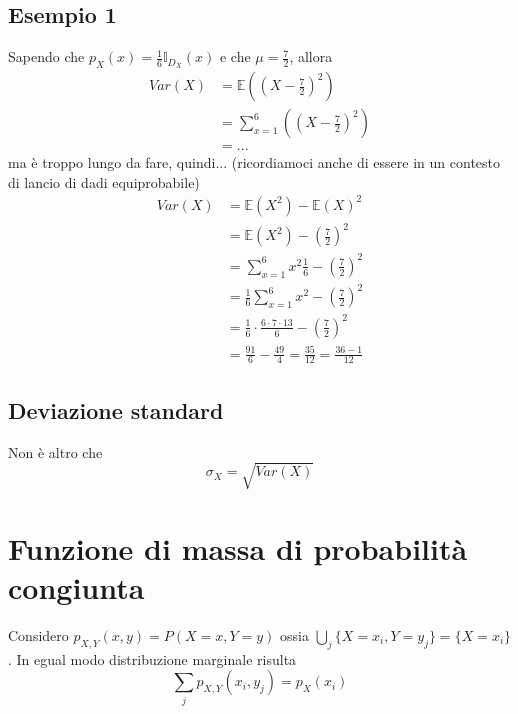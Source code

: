 \documentclass[11pt]{report}
\begin{document}
\subsection{Esempio 1}
Sapendo che $p_X(x) = \frac{1}{6} \mathbb{I}_{D_X}(x)$ e che $\mu = \frac{7}{2}$, allora
\begin{equation}
    \begin{split}
        Var(X) & = \mathbb{E} \left( \left( X - \frac{7}{2} \right)^2 \right)\\
        & = \sum_{x=1}^{6} \left( \left( X - \frac{7}{2} \right)^2 \right)\\
        & = ...
    \end{split}
\end{equation}
ma è troppo lungo da fare, quindi... (ricordiamoci anche di essere in un contesto di lancio di dadi equiprobabile)
\begin{equation}
    \begin{split}
        Var(X) & = \mathbb{E}(X^2) - \mathbb{E}(X)^2\\
        & = \mathbb{E}(X^2) - \left( \frac{7}{2} \right)^2\\
        & = \sum_{x=1}^{6}x^2\frac{1}{6} - \left( \frac{7}{2} \right)^2\\
        & = \frac{1}{6}\sum_{x=1}^{6}x^2 - \left( \frac{7}{2} \right)^2\\
        & = \frac{1}{6} \cdot \frac{6 \cdot 7 \cdot 13}{6} - \left( \frac{7}{2} \right)^2\\
        & = \frac{91}{6} - \frac{49}{4} = \frac{35}{12} = \frac{36 - 1}{12}
    \end{split}
\end{equation}
\subsection{Deviazione standard}
Non è altro che
\begin{equation}
    \sigma_X = \sqrt{Var(X)}
\end{equation}

\section{Funzione di massa di probabilità congiunta}
Considero $p_{X,Y}(x,y) = P(X = x, Y = y)$ ossia $\bigcup_{j}\{X=x_i, Y=y_j\} = \{X=x_i\}$. In egual modo distribuzione marginale risulta
\begin{equation}
    \sum_{j}p_{X,Y}(x_i,y_j) = p_X(x_i)
\end{equation}
\end{document}
